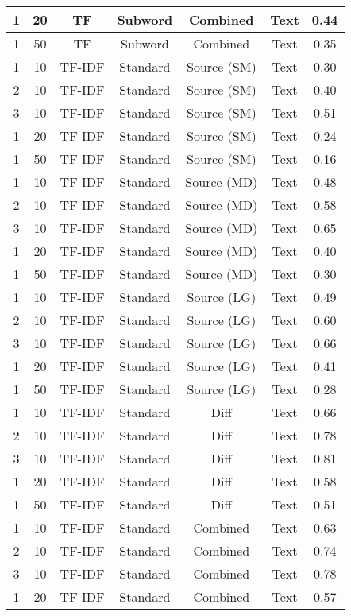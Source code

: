 \begin{longtable}{|c|c|c|c|c|c|c|}
\hline
1 & 20 & TF & Subword & Combined & Text & 0.44 \\
\hline
1 & 50 & TF & Subword & Combined & Text & 0.35 \\
\hline
1 & 10 & TF-IDF & Standard & Source (SM) & Text & 0.30 \\
\hline
2 & 10 & TF-IDF & Standard & Source (SM) & Text & 0.40 \\
\hline
3 & 10 & TF-IDF & Standard & Source (SM) & Text & 0.51 \\
\hline
1 & 20 & TF-IDF & Standard & Source (SM) & Text & 0.24 \\
\hline
1 & 50 & TF-IDF & Standard & Source (SM) & Text & 0.16 \\
\hline
1 & 10 & TF-IDF & Standard & Source (MD) & Text & 0.48 \\
\hline
2 & 10 & TF-IDF & Standard & Source (MD) & Text & 0.58 \\
\hline
3 & 10 & TF-IDF & Standard & Source (MD) & Text & 0.65 \\
\hline
1 & 20 & TF-IDF & Standard & Source (MD) & Text & 0.40 \\
\hline
1 & 50 & TF-IDF & Standard & Source (MD) & Text & 0.30 \\
\hline
1 & 10 & TF-IDF & Standard & Source (LG) & Text & 0.49 \\
\hline
2 & 10 & TF-IDF & Standard & Source (LG) & Text & 0.60 \\
\hline
3 & 10 & TF-IDF & Standard & Source (LG) & Text & 0.66 \\
\hline
1 & 20 & TF-IDF & Standard & Source (LG) & Text & 0.41 \\
\hline
1 & 50 & TF-IDF & Standard & Source (LG) & Text & 0.28 \\
\hline
1 & 10 & TF-IDF & Standard & Diff & Text & 0.66 \\
\hline
2 & 10 & TF-IDF & Standard & Diff & Text & 0.78 \\
\hline
3 & 10 & TF-IDF & Standard & Diff & Text & 0.81 \\
\hline
1 & 20 & TF-IDF & Standard & Diff & Text & 0.58 \\
\hline
1 & 50 & TF-IDF & Standard & Diff & Text & 0.51 \\
\hline
1 & 10 & TF-IDF & Standard & Combined & Text & 0.63 \\
\hline
2 & 10 & TF-IDF & Standard & Combined & Text & 0.74 \\
\hline
3 & 10 & TF-IDF & Standard & Combined & Text & 0.78 \\
\hline
1 & 20 & TF-IDF & Standard & Combined & Text & 0.57 \\

\end{longtable}
